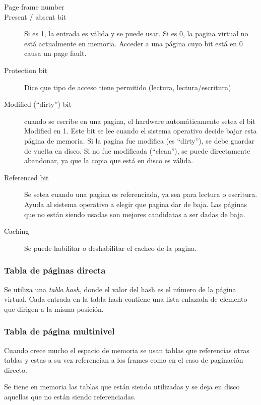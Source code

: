 \documentclass[a4paper, twoside]{article}
\begin{document}
\begin{description}
  \item[Page frame number]

  \item[Present / absent bit] Si es 1, la entrada es válida y se puede usar.
  Si es 0, la pagina virtual no está actualmente en memoria.
  Acceder a una página cuyo bit está en 0 causa un page fault.

  \item[Protection bit] Dice que tipo de acceso tiene permitido
  (lectura, lectura/escritura).

  \item[Modified (``dirty'') bit] cuando se escribe en una pagina, el hardware
  automáticamente setea el bit Modified en 1.
  Este bit se lee cuando el sistema operativo decide bajar esta página de
  memoria.
  Si la pagina fue modifica (es “dirty”), se debe guardar de vuelta en disco.
  Si no fue modificada (“clean”), se puede directamente abandonar, ya que la
  copia que está en disco es válida.

  \item[Referenced bit] Se setea cuando una pagina es referenciada, ya sea para
  lectura o escritura.
  Ayuda al sistema operativo a elegir que pagina dar de baja.
  Las páginas que no están siendo usadas son mejores candidatas a ser dadas de
  baja.

  \item[Caching] Se puede habilitar o deshabilitar el cacheo de la pagina.
\end{description}

\subsubsection{Tabla de páginas directa}

Se utiliza una \emph{tabla hash}, donde el valor del hash es el número de la
página virtual.
Cada entrada en la tabla hash contiene una lista enlazada de elemento que
dirigen a la misma posición.

\subsubsection{Tabla de página multinivel}

Cuando crece mucho el espacio de memoria se usan tablas que referencias otras
tablas y estas a su vez referencian a los frames como en el caso de paginación
directo.

Se tiene en memoria las tablas que están siendo utilizadas y se deja en disco
aquellas que no están siendo referenciadas.
\end{document}
